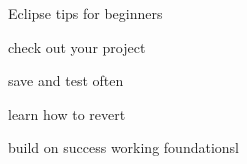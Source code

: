 Eclipse tips for beginners

check out your project

save and test often

learn how to revert

build on success working foundationsl
